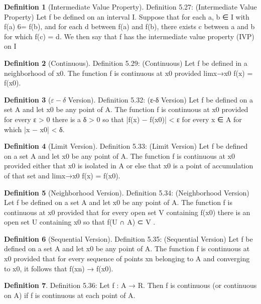 \documentclass[11pt]{article}
\def \epsilon {\varepsilon}
\theoremstyle{definition}
\newtheorem{definition}{Definition}[section]
\begin{document}
\begin{definition} [Intermediate Value Property]
	Definition 5.27: (Intermediate Value Property) Let f be defined on an interval I. Suppose that for
	each a, b ∈ I with f(a) 6= f(b), and for each d between f(a) and f(b), there exists c between a and b for
	which f(c) = d. We then say that f has the intermediate value property (IVP) on I
\end{definition}

\setcounter{definition}{28}
\begin{definition} [Continuous]
	Definition 5.29: (Continuous) Let f be defined in a neighborhood of x0. The function f is continuous
	at x0 provided limx→x0
	f(x) = f(x0).
\end{definition}

\setcounter{definition}{31}
\begin{definition} [$\epsilon - \delta$ Version]
	Definition 5.32: (ε-δ Version) Let f be defined on a set A and let x0 be any point of A. The function
	f is continuous at x0 provided for every ε > 0 there is a δ > 0 so that
	|f(x) − f(x0)| < ε
	for every x ∈ A for which |x − x0| < δ.
\end{definition}


\begin{definition} [Limit Version]
	Definition 5.33: (Limit Version) Let f be defined on a set A and let x0 be any point of A. The function
	f is continuous at x0 provided either that x0 is isolated in A or else that x0 is a point of accumulation of
	that set and
	limx→x0
	f(x) = f(x0).
\end{definition}


\begin{definition} [Neighborhood Version]
	Definition 5.34: (Neighborhood Version) Let f be defined on a set A and let x0 be any point of A.
	The function f is continuous at x0 provided that for every open set V containing f(x0) there is an open set
	U containing x0 so that f(U ∩ A) ⊂ V .
\end{definition}


\begin{definition} [Sequential Version]
	Definition 5.35: (Sequential Version) Let f be defined on a set A and let x0 be any point of A. The
	function f is continuous at x0 provided that for every sequence of points {xn} belonging to A and converging
	to x0, it follows that f(xn) → f(x0).
\end{definition}


\begin{definition}
	Definition 5.36: Let f : A → R. Then f is continuous (or continuous on A) if f is continuous at each
	point of A.
\end{definition}
\end{document}

